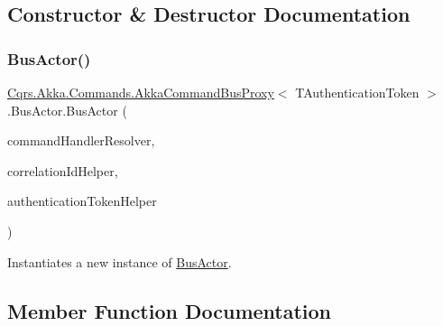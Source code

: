 \subsection{Constructor \& Destructor Documentation}
\mbox{\label{classCqrs_1_1Akka_1_1Commands_1_1AkkaCommandBusProxy_1_1BusActor_a5ddecec1b6333aaf89dbff824cf6ddd2_a5ddecec1b6333aaf89dbff824cf6ddd2}} 
\subsubsection{\texorpdfstring{Bus\+Actor()}{BusActor()}}
{\footnotesize\ttfamily \hyperlink{classCqrs_1_1Akka_1_1Commands_1_1AkkaCommandBusProxy}{Cqrs.\+Akka.\+Commands.\+Akka\+Command\+Bus\+Proxy}$<$ T\+Authentication\+Token $>$.Bus\+Actor.\+Bus\+Actor (\begin{DoxyParamCaption}\item[{\hyperlink{interfaceCqrs_1_1Akka_1_1Commands_1_1IAkkaCommandPublisher}{I\+Akka\+Command\+Publisher}$<$ T\+Authentication\+Token $>$}]{command\+Handler\+Resolver,  }\item[{I\+Correlation\+Id\+Helper}]{correlation\+Id\+Helper,  }\item[{\hyperlink{interfaceCqrs_1_1Authentication_1_1IAuthenticationTokenHelper}{I\+Authentication\+Token\+Helper}$<$ T\+Authentication\+Token $>$}]{authentication\+Token\+Helper }\end{DoxyParamCaption})}



Instantiates a new instance of \hyperlink{classCqrs_1_1Akka_1_1Commands_1_1AkkaCommandBusProxy_1_1BusActor}{Bus\+Actor}. 



\subsection{Member Function Documentation}
\mbox{\label{classCqrs_1_1Akka_1_1Commands_1_1AkkaCommandBusProxy_1_1BusActor_a2218f176012e4074308d8de36f1f48a2_a2218f176012e4074308d8de36f1f48a2}} 
